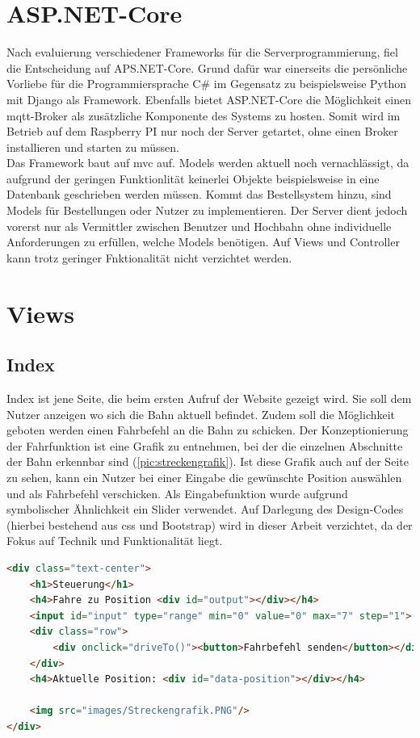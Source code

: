 \section{ASP.NET-Core}
Nach evaluierung verschiedener Frameworks für die Serverprogrammierung, fiel die Entscheidung auf APS.NET-Core. Grund dafür war einerseits die persönliche Vorliebe für die Programmiersprache C\# im Gegensatz zu beispielsweise Python mit Django als Framework. Ebenfalls bietet ASP.NET-Core die Möglichkeit einen \acrshort{mqtt}-Broker als zusätzliche Komponente des Systems zu hosten. Somit wird im Betrieb auf dem Raspberry PI nur noch der Server getartet, ohne einen Broker installieren und starten zu müssen. \\
Das Framework baut auf \acrfull{mvc} auf. Models werden aktuell noch vernachlässigt, da aufgrund der geringen Funktionlität keinerlei Objekte beispielsweise in eine Datenbank geschrieben werden müssen. Kommt das Bestellsystem hinzu, sind Models für Bestellungen oder Nutzer zu implementieren. Der Server dient jedoch vorerst nur als Vermittler zwischen Benutzer und Hochbahn ohne individuelle Anforderungen zu erfüllen, welche Models benötigen. Auf Views und Controller kann trotz geringer Fnktionalität nicht verzichtet werden. 

\section{Views}
\subsection{Index}
Index ist jene Seite, die beim ersten Aufruf der Website gezeigt wird. Sie soll dem Nutzer anzeigen wo sich die Bahn aktuell befindet. Zudem soll die Möglichkeit geboten werden einen Fahrbefehl an die Bahn zu schicken. Der Konzeptionierung der Fahrfunktion ist eine Grafik zu entnehmen, bei der die einzelnen Abschnitte der Bahn erkennbar sind (\autoref{pic:streckengrafik}). Ist diese Grafik auch auf der Seite zu sehen, kann ein Nutzer bei einer Eingabe die gewünschte Position auswählen und als Fahrbefehl verschicken. Als Eingabefunktion wurde aufgrund symbolischer Ähnlichkeit ein Slider verwendet. Auf Darlegung des Design-Codes (hierbei bestehend aus css und Bootstrap) wird in dieser Arbeit verzichtet, da der Fokus auf Technik und Funktionalität liegt. 
\vspace{1cm}

\begin{lstlisting}[language=html, style=dhpaperdefault]
<div class="text-center">
    <h1>Steuerung</h1>
    <h4>Fahre zu Position <div id="output"></div></h4>
    <input id="input" type="range" min="0" value="0" max="7" step="1">
    <div class="row">
        <div onclick="driveTo()"><button>Fahrbefehl senden</button></div>
    </div>
    <h4>Aktuelle Position: <div id="data-position"></div></h4>

	<img src="images/Streckengrafik.PNG"/>
</div>
\end{lstlisting}
\vspace{0.5cm}

